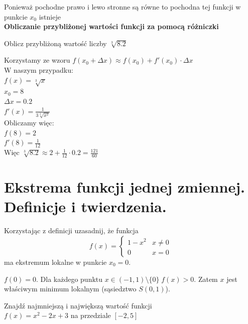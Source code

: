 \documentclass[12pt]{article}
\begin{document}
    \noindent Ponieważ pochodne prawo i lewo stronne są równe to pochodna tej funkcji w punkcie $x_{0}$ istnieje \\


    \noindent \textbf{Obliczanie przybliżonej wartości funkcji za pomocą różniczki} \\

    \begin{exercise}
		Oblicz przybliżoną wartość liczby $\sqrt[3]{8.2}$
	\end{exercise}

    \noindent Korzystamy ze wzoru $f(x_{0} + \Delta x) \approx f(x_{0}) + f'(x_{0}) \cdot \Delta x$ \\

    \noindent W naszym przypadku: \\
    $f(x) = \sqrt[3]{x}$ \\
    $x_{0} = 8$ \\
    $\Delta x = 0.2$ \\
    $f'(x) = \frac{1}{3\sqrt[3]{x^2}}$ \\

    \noindent Obliczamy więc: \\
    $f(8) = 2$ \\
    $f'(8) = \frac{1}{12}$ \\

    \noindent Więc $\sqrt[3]{8.2} \approx 2 + \frac{1}{12} \cdot 0.2 = \frac{121}{60}$

    \newpage

    \section{Ekstrema funkcji jednej zmiennej. Definicje i twierdzenia.}

    \begin{exercise}
        Korzystając z definicji uzasadnij, że funkcja
        \[f(x) = \begin{cases}
                     1 - x^2 & x \neq 0 \\
                     0 & x = 0
        \end{cases}\]
        ma ekstremum lokalne w punkcie $x_0 = 0$.
    \end{exercise}

    $f(0) = 0$. Dla każdego punktu $x \in (-1, 1) \setminus \{0\}\;  f(x) > 0$. Zatem $x$ jest właściwym minimum lokalnym (sąsiedztwo $S(0, 1)$).

    \begin{exercise}
        Znajdź najmniejszą i największą wartość funkcji\\ $f(x) = x^2 - 2x + 3$ na przedziale $[-2, 5]$
    \end{exercise}
\end{document}
